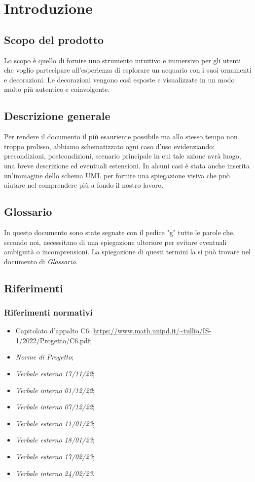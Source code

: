 \section{Introduzione}
\subsection{Scopo del prodotto}
Lo scopo è quello di fornire uno strumento intuitivo e immersivo per gli utenti che voglio partecipare all'esperienza di esplorare un acquario con i suoi ornamenti e decorazioni.
\newline
Le decorazioni vengono così esposte e visualizzate in un modo molto più autentico e coinvolgente.

\subsection{Descrizione generale}
Per rendere il documento il più esauriente possibile ma allo stesso tempo non troppo prolisso, abbiamo schematizzato ogni caso d'uso evidenziando:  precondizioni, postcondizioni, scenario principale in cui tale azione avrà luogo, una breve descrizione ed eventuali estensioni.\newline
In alcuni casi è stata anche inserita un'immagine dello schema UML per fornire una spiegazione visiva che può aiutare nel comprendere più a fondo il nostro lavoro.\newline

\subsection{Glossario}
In questo documento sono state segnate con il pedice "g" tutte le parole che, secondo noi, necessitano di una spiegazione ulteriore per evitare eventuali ambiguità o incomprensioni. La spiegazione di questi termini la si può trovare nel documento di \textit{Glossario}.

\subsection{Riferimenti}
\subsubsection{Riferimenti normativi}
\begin{itemize}
\item Capitolato d’appalto C6: \url{https://www.math.unipd.it/~tullio/IS-1/2022/Progetto/C6.pdf};
\item \textit{Norme di Progetto};
\item \textit{Verbale esterno 17/11/22};
\item \textit{Verbale interno 01/12/22};
\item \textit{Verbale interno 07/12/22};
\item \textit{Verbale esterno 11/01/23};
\item \textit{Verbale esterno 18/01/23};
\item \textit{Verbale esterno 17/02/23};
\item \textit{Verbale interno 24/02/23}.
\end{itemize}

